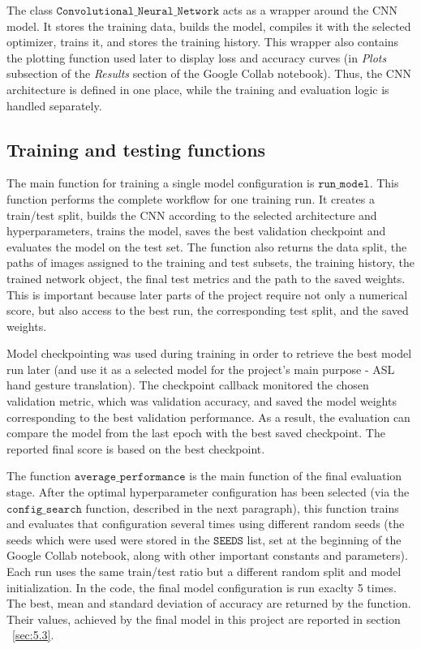 \documentclass{article}
\newcommand{\code}[1]{\texttt{#1}} %
\begin{document}
The class $\code{Convolutional\_Neural\_Network}$ acts as a wrapper around the CNN model. It stores the training data, builds the model, compiles it with the selected optimizer, 
trains it, and stores the training history. This wrapper also contains the plotting function used later to display loss and accuracy curves (in \textit{Plots} subsection of the 
\textit{Results} section of the Google Collab notebook). Thus, the CNN architecture is defined in one place, while the training and evaluation logic is handled separately.  

\subsection{Training and testing functions}
\label{sec:4.2}
The main function for training a single model configuration is $\code{run\_model}$. This function performs the complete workflow for one training run. It creates a train/test split, 
builds the CNN according to the selected architecture and hyperparameters, trains the model, saves the best validation checkpoint and evaluates the model on the test set. The function 
also returns the data split, the paths of images assigned to the training and test subsets, the training history, the trained network object, the final test metrics and the path to the 
saved weights. This is important because later parts of the project require not only a numerical score, but also access to the best run, the corresponding test split, and the saved weights.  

Model checkpointing was used during training in order to retrieve the best model run later (and use it as a selected model for the project's main purpose - ASL hand gesture translation). 
The checkpoint callback monitored the chosen validation metric, which was validation accuracy, and saved the model weights corresponding to the best validation performance. As a result, 
the evaluation can compare the model from the last epoch with the best saved checkpoint. The reported final score is based on the best checkpoint.  

The function $\code{average\_performance}$ is the main function of the final evaluation stage. After the optimal hyperparameter configuration has been selected (via the $\code{config\_search}$ 
function, described in the next paragraph), this function trains and evaluates that configuration several times using different random seeds (the seeds which were used were stored in the $\code{SEEDS}$ list, set at 
the beginning of the Google Collab notebook, along with other important constants and parameters). Each run uses the same train/test ratio but a different random split and model initialization. 
In the code, the final model configuration is run exaclty 5 times. The best, mean and standard deviation of accuracy are returned by the function. Their values, achieved
by the final model in this project are reported in section ~\ref{sec:5.3}.
\end{document}
